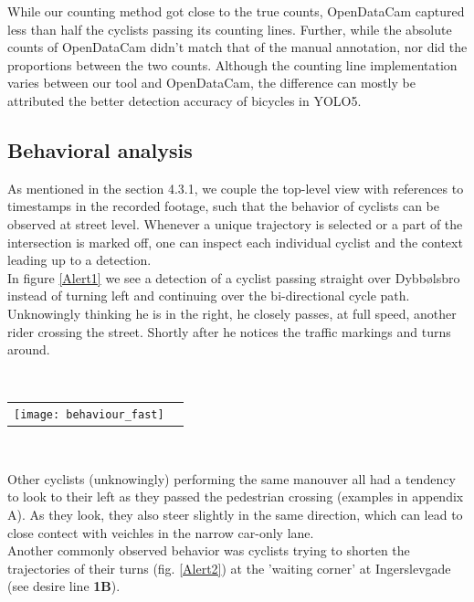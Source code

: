 While our counting method got close to the true counts, OpenDataCam captured less than half the cyclists passing its 
counting lines. Further, while the absolute counts of OpenDataCam didn't match that of the manual annotation, 
nor did the proportions between the two counts.
Although the counting line implementation varies between our tool and OpenDataCam, 
the difference can mostly be attributed the better detection accuracy of bicycles in YOLO5.
\ \\

\subsection{Behavioral analysis}
As mentioned in the section 4.3.1, we couple the top-level view with references to timestamps in the recorded footage, 
such that the behavior of cyclists can be observed at street level.
Whenever a unique trajectory is selected or a part of the intersection is marked off, one can inspect each individual cyclist 
and the context leading up to a detection.
\\

In figure \ref{Alert1} we see a detection of a cyclist passing straight over Dybbølsbro instead of turning left and 
continuing over the bi-directional cycle path. Unknowingly thinking he is in the right, he closely passes, at full speed, another rider crossing
the street. Shortly after he notices the traffic markings and turns around. 

\ \\ 
\raggedbottom
\begin{tabular}{@{}cc}
\texttt{[image: behaviour\_fast]} 
\end{tabular}
\label{Alert1}
\

Other cyclists (unknowingly) performing the same manouver all had a tendency to look to their left 
as they passed the pedestrian crossing (examples in appendix A).
As they look, they also steer slightly in the same direction, which can lead to close contect with veichles
in the narrow car-only lane. 
\ \\

Another commonly observed behavior was cyclists trying to shorten the trajectories of their turns (fig. \ref{Alert2})
at the 'waiting corner' at Ingerslevgade (see desire line \textbf{1B}).

